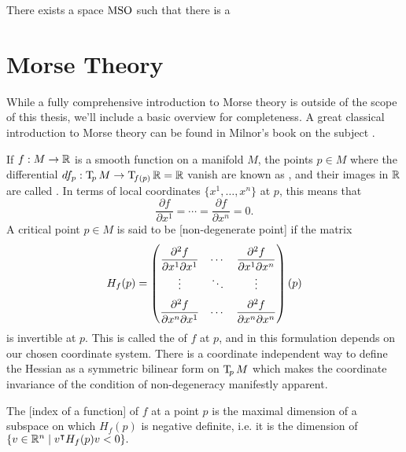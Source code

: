 \begin{theorem}
  There exists a space $\mathrm{MSO}$ such that there is a 
\end{theorem}

\section{Morse Theory}\label{sec:morse-theory}

While a fully comprehensive introduction to Morse theory is outside of the scope of this thesis, we'll include a basic overview for completeness. A great classical introduction to Morse theory can be found in Milnor's book on the subject \cite{milnor1963morse}.

If $f : M \to \mathbb{R}$ is a smooth function on a manifold $M$, the points $p\in M$ where the differential $df_p : \operatorname{T\!}_p M \to \operatorname{T\!}_{f(p)} \mathbb{R} = \mathbb{R}$ vanish are known as , and their images in $\mathbb{R}$ are called . In terms of local coordinates $\{x^1,\ldots, x^n\}$ at $p$, this means that
\[
	\frac{\partial f}{\partial x^1}=\cdots=\frac{\partial f}{\partial x^n} = 0.
\]
A critical point $p\in M$ is said to be [non-degenerate point] if the matrix
\[
	\everymath={\displaystyle}
	\renewcommand*{\arraystretch}{2}
	H_f(p) = \begin{pmatrix}
		\frac{\partial^2 f}{\partial x^1\partial x^1} & \cdots &
		\frac{\partial^2 f}{\partial x^1\partial x^n}                   \\
		\vdots                                        & \ddots & \vdots \\
		\frac{\partial^2 f}{\partial x^n\partial x^1} & \cdots &
		\frac{\partial^2 f}{\partial x^n\partial x^n}                   \\
	\end{pmatrix}(p)
\]
is invertible at $p$. This is called the  of $f$ at $p$, and in this formulation depends on our chosen coordinate system.
There is a coordinate independent way to define the Hessian as a symmetric bilinear form on $\operatorname{T\!}_p M$ which makes the coordinate invariance of the condition of non-degeneracy manifestly apparent.

\begin{definition}
	The [index of a function] of $f$ at a point $p$ is the maximal dimension of a subspace on which $H_f(p)$ is negative definite, i.e. it is the dimension of $\{v\in \mathbb{R}^n \mid v^\intercal H_f(p) v < 0\}.$
\end{definition}

